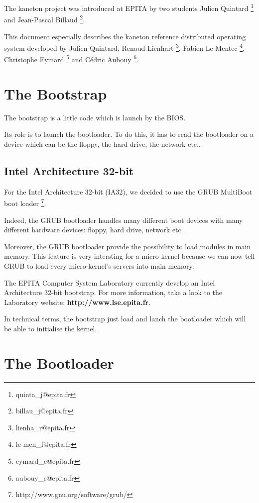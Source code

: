 \documentclass[10pt,a4wide]{article}
\begin{document}
The kaneton project was introduced at EPITA by two students
	Julien Quintard
	  \footnote{quinta\_j@epita.fr} and
	Jean-Pascal Billaud
	  \footnote{billau\_j@epita.fr}.

This document especially describes the kaneton reference distributed
operating system developed by
	Julien Quintard,
	Renaud Lienhart
	  \footnote{lienha\_r@epita.fr},
	Fabien Le-Mentec
	  \footnote{le-men\_f@epita.fr},
	Christophe Eymard
	  \footnote{eymard\_c@epita.fr} and
	C\'edric Aubouy
	  \footnote{aubouy\_c@epita.fr}.



\section{The Bootstrap}

The bootstrap is a little code which is launch by the BIOS.

Its role is to launch the bootloader. To do this, it has to read the
bootloader on a device which can be the floppy, the hard drive,
the network etc..

\subsection{Intel Architecture 32-bit}

For the Intel Architecture 32-bit (IA32), we decided to use the
	GRUB MultiBoot boot loader
	  \footnote{http://www.gnu.org/software/grub/}.

Indeed, the GRUB bootloader handles many different boot devices with
many different hardware devices: floppy, hard drive, network etc..

Moreover, the GRUB bootloader provide the possibility to load
modules in main memory. This feature is very intersting for a micro-kernel
because we can now tell GRUB to load every micro-kernel's servers into
main memory.

The EPITA Computer System Laboratory currently develop an Intel Architecture
32-bit bootstrap. For more information, take a look to the Laboratory
website: \textbf{http://www.lse.epita.fr}.

In technical terms, the bootstrap just load and lanch the bootloader
which will be able to initialise the kernel.



\section{The Bootloader}
\end{document}

